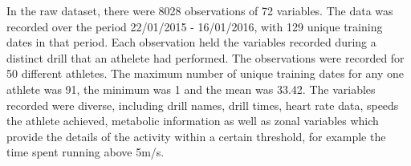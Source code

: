 In the raw dataset, there were 8028 observations of 72 variables. The data was recorded over the period 22/01/2015 - 16/01/2016, with 129 unique training dates in that period. Each observation held the variables recorded during a distinct drill that an athelete had performed. The observations were recorded for 50 different athletes. The maximum number of unique training dates for any one athlete was 91, the minimum was 1 and the mean was 33.42. The variables recorded were diverse, including drill names, drill times, heart rate data, speeds the athlete achieved, metabolic information as well as zonal variables which provide the details of the activity within a certain threshold, for example the time spent running above 5m/s.






